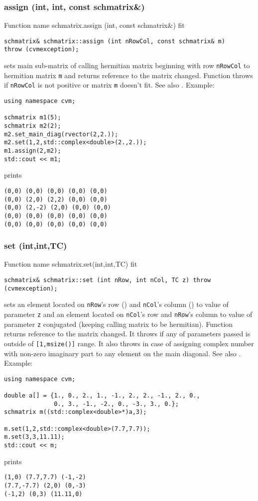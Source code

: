 \subsubsection{assign (int, int, const schmatrix\&)}
Function%
\pdfdest name {schmatrix.assign (int, const schmatrix&)} fit
\begin{verbatim}
schmatrix& schmatrix::assign (int nRowCol, const schmatrix& m)
throw (cvmexception);
\end{verbatim}
sets main sub-matrix of  calling hermitian matrix beginning with \Based row
\verb"nRowCol" to  hermitian matrix \verb"m" and
returns  reference to the matrix changed.
Function throws 
  if \verb"nRowCol"
is not positive or matrix \verb"m" doesn't fit.
See also .
Example:
\begin{Verbatim}
using namespace cvm;

schmatrix m1(5);
schmatrix m2(2);
m2.set_main_diag(rvector(2,2.));
m2.set(1,2,std::complex<double>(2.,2.));
m1.assign(2,m2);
std::cout << m1;
\end{Verbatim}
prints
\begin{Verbatim}
(0,0) (0,0) (0,0) (0,0) (0,0)
(0,0) (2,0) (2,2) (0,0) (0,0)
(0,0) (2,-2) (2,0) (0,0) (0,0)
(0,0) (0,0) (0,0) (0,0) (0,0)
(0,0) (0,0) (0,0) (0,0) (0,0)
\end{Verbatim}
\newpage



\subsubsection{set (int,int,TC)}
Function%
\pdfdest name {schmatrix.set(int,int,TC)} fit
\begin{verbatim}
schmatrix& schmatrix::set (int nRow, int nCol, TC z) throw (cvmexception);
\end{verbatim}
sets an element located on \verb"nRow"'s row (\Based)
and \verb"nCol"'s column (\Based) to  value of
parameter \verb"z" and
an element located
on \verb"nCol"'s row
and \verb"nRow"'s column to  value of
parameter \verb"z" conjugated (keeping
 calling matrix to be hermitian).
Function returns  reference to
the matrix changed.
It throws 
if any of parameters passed
is outside of \verb"[1,msize()]" range.
It also throws in case of assigning
complex number with non-zero imaginary part
to any element on the main diagonal.
See also .
Example:
\begin{Verbatim}
using namespace cvm;

double a[] = {1., 0., 2., 1., -1., 2., 2., -1., 2., 0.,
              0., 3., -1., -2., 0., -3., 3., 0.};
schmatrix m((std::complex<double>*)a,3);

m.set(1,2,std::complex<double>(7.7,7.7));
m.set(3,3,11.11);
std::cout << m;
\end{Verbatim}
prints
\begin{Verbatim}
(1,0) (7.7,7.7) (-1,-2)
(7.7,-7.7) (2,0) (0,-3)
(-1,2) (0,3) (11.11,0)
\end{Verbatim}
\newpage



